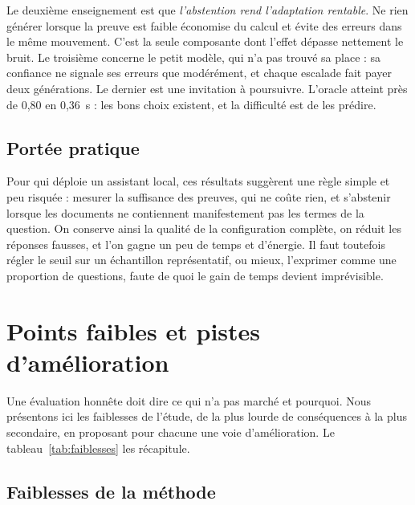 \documentclass[11pt,a4paper]{article}
\begin{document}
Le deuxième enseignement est que \emph{l'abstention rend l'adaptation rentable}. Ne rien générer
lorsque la preuve est faible économise du calcul et évite des erreurs dans le même mouvement. C'est la
seule composante dont l'effet dépasse nettement le bruit. Le troisième concerne le petit modèle, qui n'a
pas trouvé sa place : sa confiance ne signale ses erreurs que modérément, et chaque escalade fait payer
deux générations. Le dernier est une invitation à poursuivre. L'oracle atteint près de 0,80 en 0,36~s :
les bons choix existent, et la difficulté est de les prédire.

\subsection{Portée pratique}

Pour qui déploie un assistant local, ces résultats suggèrent une règle simple et peu risquée : mesurer la
suffisance des preuves, qui ne coûte rien, et s'abstenir lorsque les documents ne contiennent
manifestement pas les termes de la question. On conserve ainsi la qualité de la configuration complète,
on réduit les réponses fausses, et l'on gagne un peu de temps et d'énergie. Il faut toutefois régler le
seuil sur un échantillon représentatif, ou mieux, l'exprimer comme une proportion de questions, faute
de quoi le gain de temps devient imprévisible.

\section{Points faibles et pistes d'amélioration}\label{sec:faiblesses}

Une évaluation honnête doit dire ce qui n'a pas marché et pourquoi. Nous présentons ici les faiblesses
de l'étude, de la plus lourde de conséquences à la plus secondaire, en proposant pour chacune une voie
d'amélioration. Le tableau~\ref{tab:faiblesses} les récapitule.

\subsection{Faiblesses de la méthode}
\end{document}
